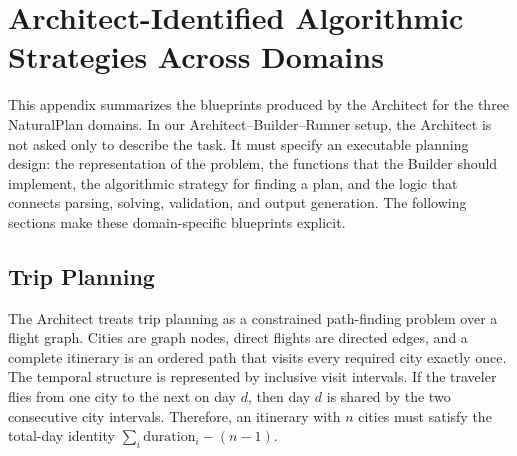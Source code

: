 \section{Architect-Identified Algorithmic Strategies Across Domains}
\label{app:architect-strategies}

This appendix summarizes the blueprints produced by the Architect for the three
NaturalPlan domains.  In our Architect--Builder--Runner setup, the Architect is
not asked only to describe the task.  It must specify an executable planning
design: the representation of the problem, the functions that the Builder
should implement, the algorithmic strategy for finding a plan, and the logic
that connects parsing, solving, validation, and output generation.  The
following sections make these domain-specific blueprints explicit.

\subsection{Trip Planning}

The Architect treats trip planning as a constrained path-finding problem over a
flight graph.  Cities are graph nodes, direct flights are directed edges, and a
complete itinerary is an ordered path that visits every required city exactly
once.  The temporal structure is represented by inclusive visit intervals.  If
the traveler flies from one city to the next on day \(d\), then day \(d\) is
shared by the two consecutive city intervals.  Therefore, an itinerary with
\(n\) cities must satisfy the total-day identity
\(\sum_i \mathrm{duration}_i - (n-1)\).


